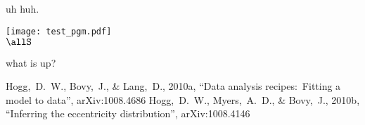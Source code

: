 \documentclass[12pt,twoside,dvipdf]{article}
\begin{document}
uh huh.

\clearpage

\noindent
\texttt{[image: test\_pgm.pdf]}\\
$\allS$

\begin{problem}
what is up?
\end{problem}

\clearpage
{}\theendnotes

\clearpage
\begin{thebibliography}{}\raggedright
{}
  Hogg,~D.~W., Bovy,~J., \& Lang,~D., 2010a,
  ``Data analysis recipes:\ Fitting a model to data'', arXiv:1008.4686
  Hogg,~D.~W., Myers,~A.~D., \& Bovy,~J., 2010b,
  ``Inferring the eccentricity distribution'', arXiv:1008.4146
\end{thebibliography}
\end{document}
